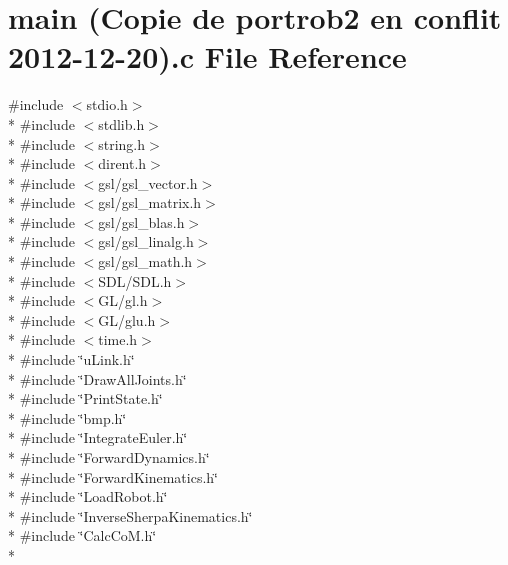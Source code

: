 \hypertarget{main_01_07_copie_01de_01portrob2_01en_01conflit_012012-12-20_08_8c}{\section{main (Copie de portrob2 en conflit 2012-\/12-\/20).c File Reference}
\label{main_01_07_copie_01de_01portrob2_01en_01conflit_012012-12-20_08_8c}
}
{\ttfamily \#include $<$stdio.\-h$>$}\\*
{\ttfamily \#include $<$stdlib.\-h$>$}\\*
{\ttfamily \#include $<$string.\-h$>$}\\*
{\ttfamily \#include $<$dirent.\-h$>$}\\*
{\ttfamily \#include $<$gsl/gsl\-\_\-vector.\-h$>$}\\*
{\ttfamily \#include $<$gsl/gsl\-\_\-matrix.\-h$>$}\\*
{\ttfamily \#include $<$gsl/gsl\-\_\-blas.\-h$>$}\\*
{\ttfamily \#include $<$gsl/gsl\-\_\-linalg.\-h$>$}\\*
{\ttfamily \#include $<$gsl/gsl\-\_\-math.\-h$>$}\\*
{\ttfamily \#include $<$S\-D\-L/\-S\-D\-L.\-h$>$}\\*
{\ttfamily \#include $<$G\-L/gl.\-h$>$}\\*
{\ttfamily \#include $<$G\-L/glu.\-h$>$}\\*
{\ttfamily \#include $<$time.\-h$>$}\\*
{\ttfamily \#include \char`\"{}u\-Link.\-h\char`\"{}}\\*
{\ttfamily \#include \char`\"{}Draw\-All\-Joints.\-h\char`\"{}}\\*
{\ttfamily \#include \char`\"{}Print\-State.\-h\char`\"{}}\\*
{\ttfamily \#include \char`\"{}bmp.\-h\char`\"{}}\\*
{\ttfamily \#include \char`\"{}Integrate\-Euler.\-h\char`\"{}}\\*
{\ttfamily \#include \char`\"{}Forward\-Dynamics.\-h\char`\"{}}\\*
{\ttfamily \#include \char`\"{}Forward\-Kinematics.\-h\char`\"{}}\\*
{\ttfamily \#include \char`\"{}Load\-Robot.\-h\char`\"{}}\\*
{\ttfamily \#include \char`\"{}Inverse\-Sherpa\-Kinematics.\-h\char`\"{}}\\*
{\ttfamily \#include \char`\"{}Calc\-Co\-M.\-h\char`\"{}}\\*
